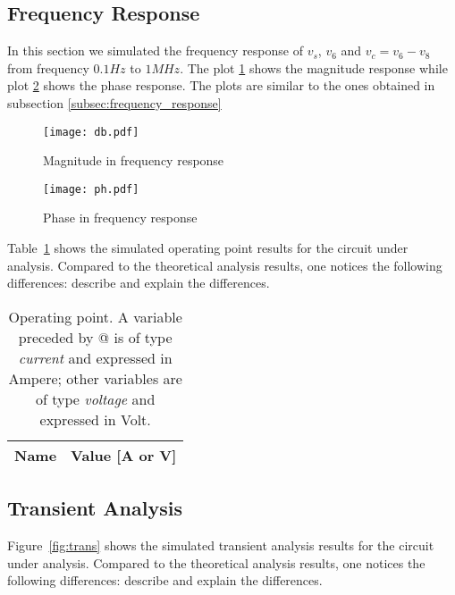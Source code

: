 \subsection{Frequency Response}

\par In this section we simulated the frequency response of $v_s$, $v_6$ and $v_c=v_6-v_8$ from frequency $0.1 Hz$ to $1 MHz$. The plot \ref{fig:magnitude} shows the magnitude response while plot \ref{fig:phase} shows the phase response. The plots are similar to the ones obtained in subsection \ref{subsec:frequency_response}

\begin{figure}[h] \centering
\texttt{[image: db.pdf]}
\caption{Magnitude in frequency response}
\label{fig:magnitude}
\end{figure}

\begin{figure}[h] \centering
\texttt{[image: ph.pdf]}
\caption{Phase in frequency response}
\label{fig:phase}
\end{figure}











Table~\ref{tab:op} shows the simulated operating point results for the circuit
under analysis. Compared to the theoretical analysis results, one notices the
following differences: describe and explain the differences.

\begin{table}[h]
  \centering
  \begin{tabular}{|l|r|}
    \hline    
    {\bf Name} & {\bf Value [A or V]} \\ \hline
    
  \end{tabular}
  \caption{Operating point. A variable preceded by @ is of type {\em current}
    and expressed in Ampere; other variables are of type {\it voltage} and expressed in
    Volt.}
  \label{tab:op}
\end{table}

\lipsum[1-1]


\subsection{Transient Analysis}

Figure~\ref{fig:trans} shows the simulated transient analysis results for the
circuit under analysis. Compared to the theoretical analysis results, one
notices the following differences: describe and explain the differences.

